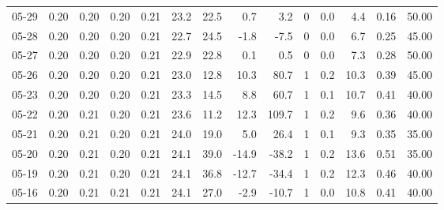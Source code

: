 \begin{threeparttable}
{\begin{tabular}{lrrrrrrrrrrrrr}
  05-29 &          0.20 &          0.20 &          0.20 &        0.21 &                23.2 &                22.5 &        0.7 &          3.2 &              0 &                 0.0 &              4.4 &            0.16 &                  50.00 \\
  05-28 &          0.20 &          0.20 &          0.20 &        0.21 &                22.7 &                24.5 &       -1.8 &         -7.5 &              0 &                 0.0 &              6.7 &            0.25 &                  45.00 \\
  05-27 &          0.20 &          0.20 &          0.20 &        0.21 &                22.9 &                22.8 &        0.1 &          0.5 &              0 &                 0.0 &              7.3 &            0.28 &                  50.00 \\
  05-26 &          0.20 &          0.20 &          0.20 &        0.21 &                23.0 &                12.8 &       10.3 &         80.7 &              1 &                 0.2 &             10.3 &            0.39 &                  45.00 \\
  05-23 &          0.20 &          0.20 &          0.20 &        0.21 &                23.3 &                14.5 &        8.8 &         60.7 &              1 &                 0.1 &             10.7 &            0.41 &                  40.00 \\
  05-22 &          0.20 &          0.21 &          0.20 &        0.21 &                23.6 &                11.2 &       12.3 &        109.7 &              1 &                 0.2 &              9.6 &            0.36 &                  40.00 \\
  05-21 &          0.20 &          0.21 &          0.20 &        0.21 &                24.0 &                19.0 &        5.0 &         26.4 &              1 &                 0.1 &              9.3 &            0.35 &                  35.00 \\
  05-20 &          0.20 &          0.21 &          0.20 &        0.21 &                24.1 &                39.0 &      -14.9 &        -38.2 &              1 &                 0.2 &             13.6 &            0.51 &                  35.00 \\
  05-19 &          0.20 &          0.21 &          0.20 &        0.21 &                24.1 &                36.8 &      -12.7 &        -34.4 &              1 &                 0.2 &             12.3 &            0.46 &                  40.00 \\
  05-16 &          0.20 &          0.21 &          0.21 &        0.21 &                24.1 &                27.0 &       -2.9 &        -10.7 &              1 &                 0.0 &             10.8 &            0.41 &                  40.00 \\

\end{tabular}}
\end{threeparttable}

